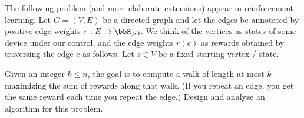\documentclass{article}
\begin{document}
 The following problem (and more elaborate extensions) appear in
reinforcement learning. Let \( G = (V, E) \) be a directed graph and let the edges be
annotated by positive edge weights \( r : E \to \bbR_{>0} \). We think of the vertices as states
of some device under our control, and the edge weights \( r(e) \) as rewards obtained by
traversing the edge \( e \) as follows. Let \( s \in V \) be a fixed starting vertex / state.

\setcounter{section}{8}
\setcounter{exercise}{2}


\begin{subexercise}
Given an integer \( k\leq n \), the goal is to compute a walk of length at most \( k \) maximizing the sum of rewards along that walk. (If you repeat an edge, you get the same reward each time you repeat the edge.) Design and analyze an algorithm for this problem.
\end{subexercise}
\end{document}
